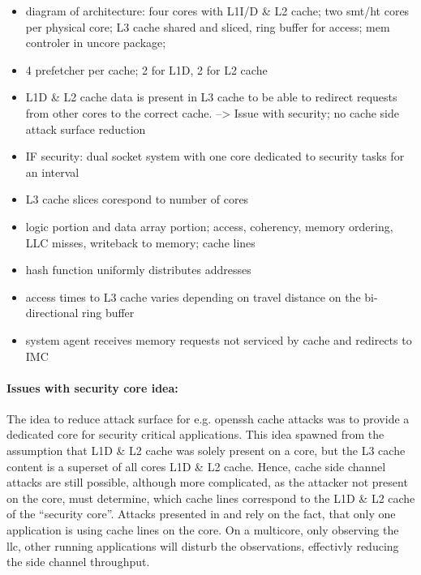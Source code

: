 \begin{itemize}
  \item diagram of architecture: four cores with L1I/D \& L2 cache; two smt/ht
    cores per physical core; L3 cache shared and sliced, ring buffer for
    access; mem controler in uncore package;
  \item 4 prefetcher per cache; 2 for L1D, 2 for L2 cache
  \item L1D \& L2 cache data is present in L3 cache to be able to redirect
    requests from other cores to the correct cache. --> Issue with security; no
    cache side attack surface reduction
  \item IF security: dual socket system with one core dedicated to security
    tasks for an interval
  \item L3 cache slices corespond to number of cores
  \item logic portion and data array portion; access, coherency, memory
    ordering, LLC misses, writeback to memory; cache lines
  \item hash function uniformly distributes addresses
  \item access times to L3 cache varies depending on travel distance on the
    bi-directional ring buffer
  \item system agent receives memory requests not serviced by cache and
    redirects to IMC
\end{itemize}

\paragraph{Issues with security core idea:}
The idea to reduce attack surface for e.g. openssh cache attacks was to provide
a dedicated core for security critical applications.
This idea spawned from the assumption that L1D \& L2 cache was solely present
on a core, but the L3 cache content is a superset of all cores L1D \& L2 cache.
Hence, cache side channel attacks are still possible, although more
complicated, as the attacker not present on the core, must determine, which
cache lines correspond to the L1D \& L2 cache of the ``security core''.
Attacks presented in \cite{yarom_recovering_2014} and
\cite{bernstein_cache-timing_2005} rely on the fact, that only one application
is using cache lines on the core.
On a multicore, only observing the \gls{llc}, other running applications will
disturb the observations, effectivly reducing the side channel throughput.

